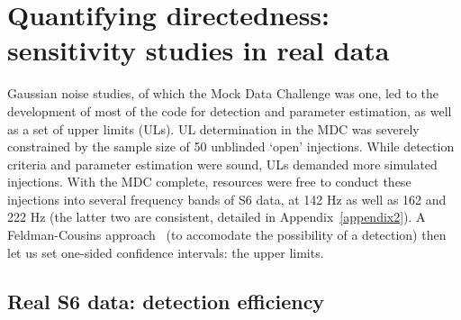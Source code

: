 
        \section{Quantifying directedness: sensitivity studies in real data}
        \label{quant_directed}

Gaussian noise studies, of which the Mock Data Challenge was one, led to the development of most of the code for detection and parameter estimation, as well as a set of upper limits (ULs).
UL determination in the MDC was severely constrained by the sample size of 50 unblinded `open' injections.
While detection criteria and parameter estimation were sound, ULs demanded more simulated injections.
With the MDC complete, resources were free to conduct these injections into several frequency bands of S6 data, at 142 Hz as well as 162 and 222 Hz (the latter two are consistent, detailed in Appendix~\ref{appendix2}).
A Feldman-Cousins approach~\cite{FeldmanCousins1998} (to accomodate the possibility of a detection) then let us set one-sided confidence intervals: the upper limits.





        \subsection{Real S6 data: detection efficiency}

